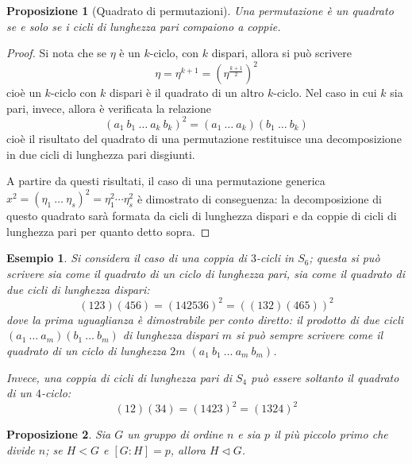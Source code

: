 \documentclass[12pt]{scrartcl}
\theoremstyle{style}
\newtheorem{esempio}{Esempio}[section]
\newtheorem{prop}{Proposizione}[section]
\numberwithin{equation}{subsection}
\begin{document}
\begin{prop}[Quadrato di permutazioni]\label{qperm}
	Una permutazione \`e un quadrato se e solo se i cicli di lunghezza pari compaiono a coppie.
\end{prop}
	\begin{proof}
		Si nota che se $\eta$ \`e un $k$-ciclo, con $k$ dispari, allora si pu\`o scrivere
		\[
		\eta = \eta^{k+1} = \left(\eta^{\frac{k+1}{2}}\right) ^2
		\] 
		cio\`e un $k$-ciclo con $k$ dispari \`e il quadrato di un altro $k$-ciclo.
		Nel caso in cui $k$ sia pari, invece, allora \`e verificata la relazione
		\[
			(a_1 \ b_1 \ \ldots \ a_k\ b_k)^2 = (a_1\ \ldots\ a_k) (b_1\ \ldots \ b_k)
		\] 
	cio\`e il risultato del quadrato di una permutazione restituisce una decomposizione in due cicli di lunghezza pari disgiunti.	

	A partire da questi risultati, il caso di una permutazione generica $x^2= (\eta_1 \ \ldots\ \eta_s)^2=\eta_1^2 \cdots \eta_s^2$ \`e dimostrato di conseguenza: la decomposizione di questo quadrato sar\`a formata da cicli di lunghezza dispari e da coppie di cicli di lunghezza pari per quanto detto sopra.
\end{proof}
\begin{esempio}
Si considera il caso di una coppia di $3$-cicli in $S_6$; questa si pu\`o scrivere sia come il quadrato di un ciclo di lunghezza pari, sia come il quadrato di due cicli di lunghezza dispari:
\[
	(123)(456) = (142536)^2 = ((132)(465))^2
\] 
dove la prima uguaglianza \`e dimostrabile per conto diretto: il prodotto di due cicli $(a_1\ \ldots\ a_m)(b_1\ \ldots\ b_m)$ di lunghezza dispari $m$ si pu\`o sempre scrivere come il quadrato di un ciclo di lunghezza $2m$ $(a_1\ b_1\ \ldots\ a_m\ b_m)$.

Invece, una coppia di cicli di lunghezza pari di $S_4$ pu\`o essere soltanto il quadrato di un $4$-ciclo:
\[
	(12)(34) = (1423)^2 = (1324)^2
\] 

\end{esempio}
\begin{prop}\label{propnlag}
	Sia $G$ un gruppo di ordine $n$ e sia $p$ il pi\`u piccolo primo che divide $n$; se $H < G$ e $[G : H ] = p$, allora $H \lhd G$.
\end{prop}
\end{document}
